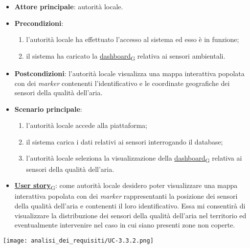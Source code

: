 \newpage
{}
\begin{itemize}
	\item \textbf{Attore principale}: autorità locale.
	\item \textbf{Precondizioni}:
	      \begin{enumerate}
		      \item l'autorità locale ha effettuato l'accesso al sistema ed esso è in funzione;
		      \item il sistema ha caricato la \href{https://7last.github.io/docs/pb/documentazione-interna/glossario\#dashboard}{dashboard\textsubscript{G}} relativa ai sensori ambientali.
	      \end{enumerate}
	\item \textbf{Postcondizioni}: l'autorità locale visualizza una mappa interattiva popolata con dei \textit{marker} contenenti l'identificativo e le coordinate geografiche dei sensori della qualità dell'aria.
	\item \textbf{Scenario principale}:
	      \begin{enumerate}
		      \item l'autorità locale accede alla piattaforma;
		      \item il sistema carica i dati relativi ai sensori interrogando il database;
		      \item l'autorità locale seleziona la visualizzazione della \href{https://7last.github.io/docs/pb/documentazione-interna/glossario\#dashboard}{dashboard\textsubscript{G}} relativa ai sensori della qualità dell'aria.
	      \end{enumerate}
	\item \href{https://7last.github.io/docs/pb/documentazione-interna/glossario\#user-story}{\textbf{User story}\textsubscript{G}}:
	      come autorità locale desidero poter visualizzare una mappa interattiva popolata con dei \textit{marker} rappresentanti la posizione dei sensori della qualità dell'aria
	      e contenenti il loro identificativo. Essa mi consentirà di visualizzare la distribuzione dei sensori della qualità dell'aria nel territorio ed eventualmente intervenire nel caso in cui siano presenti zone non coperte.
\end{itemize}
\begin{center}
	\texttt{[image: analisi\_dei\_requisiti/UC-3.3.2.png]}
\end{center}

